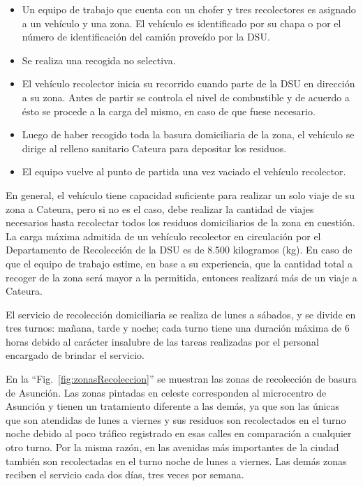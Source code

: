 \documentclass[spanish, conference]{IEEEtran}
\begin{document}
\begin{itemize}
\item Un equipo de trabajo que cuenta con un chofer y tres recolectores es asignado a un vehículo y una zona. El vehículo es identificado por su chapa o por el número de identificación del camión proveído por la DSU.
\item Se realiza una recogida no selectiva.
\item El vehículo recolector inicia su recorrido cuando parte de la DSU en dirección a su zona. Antes de partir se controla el nivel de combustible y de acuerdo a ésto se procede a la carga del mismo, en caso de que fuese necesario.
\item Luego de haber recogido toda la basura domiciliaria de la zona, el vehículo se dirige al relleno sanitario Cateura para depositar los residuos.
\item El equipo vuelve al punto de partida una vez vaciado el vehículo recolector.  
\end{itemize}

En general, el vehículo tiene capacidad suficiente para realizar un solo viaje de su zona a Cateura, pero si no es el caso, debe realizar la cantidad de viajes necesarios hasta recolectar todos los residuos domiciliarios de la zona en cuestión. La carga máxima admitida de un vehículo recolector en circulación por el Departamento de Recolección de la DSU es de 8.500 kilogramos (kg). En caso de que el equipo de trabajo estime, en base a su experiencia, que la cantidad total a recoger de la zona será mayor a la permitida, entonces realizará más de un viaje a Cateura.

El servicio de recolección domiciliaria se realiza de lunes a sábados, y se divide en tres turnos: mañana, tarde y noche; cada turno tiene una duración máxima de 6 horas debido al carácter insalubre de las tareas realizadas por el personal encargado de brindar el servicio.

En la ``Fig.~\ref{fig:zonasRecoleccion}'' se muestran las zonas de recolección de basura de Asunción. Las zonas pintadas en celeste corresponden al microcentro de Asunción y tienen un tratamiento diferente a las demás, ya que son las únicas que son atendidas de lunes a viernes y sus residuos son recolectados en el turno noche debido al poco tráfico registrado en esas calles en comparación a cualquier otro turno. Por la misma razón, en las avenidas más importantes de la ciudad también son recolectadas en el turno noche de lunes a viernes. Las demás zonas reciben el servicio cada dos días, tres veces por semana.
\end{document}
